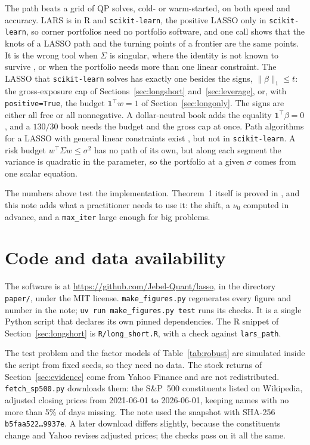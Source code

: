 \documentclass[11pt]{article}
\newcommand{\trans}{^{\top}}
\newcommand{\Sig}{\Sigma}
\begin{document}
The path beats a grid of QP solves, cold- or warm-started, on both speed and accuracy. LARS is in R
and \texttt{scikit-learn}, the positive LASSO only in \texttt{scikit-learn}, so corner
portfolios need no portfolio software, and one call
shows that the knots of a LASSO path and the turning points of a frontier are the same
points. It is the wrong tool when $\Sig$ is singular,
where the identity is not known to survive \cite[\S7]{perspective}, or when the portfolio
needs more than one linear constraint. The LASSO that \texttt{scikit-learn} solves has
exactly one besides the signs, $\|\beta\|_1\le t$: the gross-exposure cap of
Sections~\ref{sec:longshort} and~\ref{sec:leverage}, or, with \texttt{positive=True},
the budget $\mathbf 1\trans w=1$ of Section~\ref{sec:longonly}. The signs are either all
free or all nonnegative. A dollar-neutral book adds the equality $\mathbf 1\trans\beta=0$,
and a $130/30$ book needs the budget and the gross cap at once. Path algorithms for a
LASSO with general linear constraints exist \cite{gaines2018,james2020}, but not in
\texttt{scikit-learn}. A risk budget $w\trans\Sig w\le\sigma^2$ has no path of its own, but
along each segment the variance is quadratic in the parameter, so the portfolio at a
given $\sigma$ comes from one scalar equation.

The numbers above test the implementation. Theorem~1 itself is proved in
\cite{perspective}, and this note adds what a practitioner needs to use it: the shift, a
$\nu_0$ computed in advance, and a \texttt{max\_iter} large enough for big problems.

\section*{Code and data availability}
\label{sec:availability}

The software is at \url{https://github.com/Jebel-Quant/lasso}, in the directory
\texttt{paper/}, under the MIT license. \texttt{make\_figures.py} regenerates every
figure and number in the note; \texttt{uv run make\_figures.py test} runs its checks. It
is a single Python script that declares its own pinned dependencies. The R snippet of
Section~\ref{sec:longshort} is \texttt{R/long\_short.R}, with a check against
\texttt{lars\_path}.

The test problem and the factor models of Table~\ref{tab:robust} are simulated inside
the script from fixed seeds, so they need no data. The stock returns of
Section~\ref{sec:evidence} come from Yahoo Finance and are not redistributed.
\texttt{fetch\_sp500.py} downloads them: the S\&P~500 constituents listed on Wikipedia,
adjusted closing prices from 2021-06-01 to 2026-06-01, keeping names with no more than
5\% of days missing. The note used the snapshot with SHA-256 \texttt{b5faa522\ldots9937e}.
A later download differs slightly, because the constituents change and Yahoo revises
adjusted prices; the checks pass on it all the same.
\end{document}
